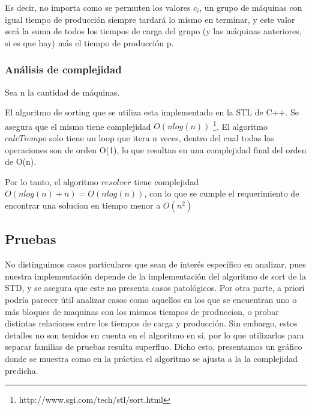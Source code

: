 Es decir, no importa como se permuten los valores $c_i$, un grupo de m\'aquinas con igual tiempo de producci\'on siempre tardar\'a lo mismo en terminar, y este valor ser\'a la suma de todos los tiempos de carga del grupo (y las m\'aquinas anteriores, si es que hay) m\'as el tiempo de producci\'on p.
 

\subsubsection{An\'alisis de complejidad}
 
 Sea n la cantidad de m\'aquinas.
 
 El algoritmo de sorting que se utiliza esta implementado en la STL de C++. Se asegura que el mismo tiene complejidad $O(n log(n))$ \footnote{http://www.sgi.com/tech/stl/sort.html}.
 El algoritmo $calcTiempo$ solo tiene un loop que itera n veces, dentro del cual todas las operaciones son de orden O(1), lo que resultan en una complejidad final del orden de O(n).
 
Por lo tanto, el algoritmo $resolver$ tiene complejidad $O(n log(n) + n) = O(n log(n))$, con lo que se cumple el requerimiento de encontrar una solucion en tiempo menor a $O(n^2)$

\subsection{Pruebas}
No distinguimos casos particulares que sean de inter\'es espec\'ifico en analizar, pues nuestra implementaci\'on depende de la implementaci\'on del algoritmo de sort de la STD, y se asegura que este no presenta casos patol\'ogicos.
Por otra parte, a priori podr\'ia parecer \'util analizar casos como aquellos en los que se encuentran  uno o m\'as bloques de maquinas con los mismos tiempos de produccion, o probar distintas relaciones entre los tiempos de carga y producci\'on. Sin embargo, estos detalles no son tenidos en cuenta en el algoritmo en s\'i, por lo que utilizarlos para separar familias de pruebas resulta superfluo.
Dicho esto, presentamos un gr\'afico donde se muestra como en la pr\'actica el algoritmo se ajusta a la la complejidad predicha.


